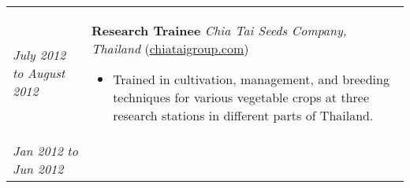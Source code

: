 ﻿\documentclass[a4paper]{article}
\begin{document}
\begin{tabular}{p{3cm} p{14cm}}
\vspace{0pt} 
\textit{July 2012}\newline
\textit{to}\newline
\textit{August 2012}\newline
&
\vspace{0pt}
\textbf{Research Trainee}\newline
\textit{Chia Tai Seeds Company, Thailand} (\href{http://www.chiataigroup.com/AboutUs.aspx}{chiataigroup.com})
\begin{itemize}[noitemsep,topsep=0pt]
  \item Trained in cultivation, management, and breeding techniques for various vegetable crops at three research stations in different parts of Thailand.
\end{itemize}
%
\\
%
\vspace{0pt} 
\textit{Jan 2012}\newline
\textit{to}\newline
\textit{Jun 2012}\newline
&
\vspace{0pt}


\end{tabular}
\end{document}
